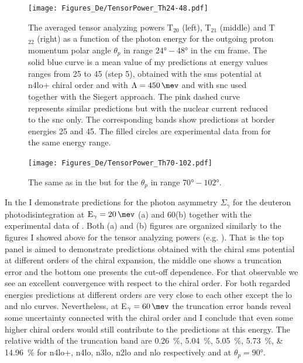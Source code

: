    \begin{figure}[h]
        \begin{center}
        \texttt{[image: Figures\_De/TensorPower\_Th24-48.pdf]}
        \end{center}
        \caption{The averaged tensor analyzing powers T$_{20}$ (left),
        T$_{21}$ (middle) and T$_{22}$ (right) as a function of the
        photon energy for the outgoing proton momentum polar angle $\theta_p$
        in range $\ang{24} - \ang{48}$ in the \gls{cm} frame.
        The solid blue curve is a mean value of my predictions at energy values ranges
        from 25 to \SI{45}{\mev} (step \SI{5}{\mev}), obtained with
        the \gls{sms} potential at \gls{n4lo+} chiral order and with $\Lambda=\SI{450}{\mev}$
        and with \gls{snc} used together with the Siegert approach. 
        The pink dashed curve represents similar predictions but with
        the nuclear current reduced to the \gls{snc} only. 
        The corresponding bands show predictions at border energies 25 and \SI{45}{\mev}.
        The filled circles are experimental data
        from \cite{rachek2007} for the same energy range.}
        \label{tensor_energy_24-48}
    \end{figure}

    \begin{figure}[h]
        \begin{center}
        \texttt{[image: Figures\_De/TensorPower\_Th70-102.pdf]}
        \end{center}
        \caption{The same as in the  but
        for the $\theta_p$ in range $\ang{70} - \ang{102}$.}
        \label{tensor_energy_70-102}
    \end{figure}
    
    In the  I demonstrate predictions
    for the photon asymmetry $\Sigma_\gamma$ for the 
    deuteron photodisintegration at $\text{E}_\gamma=\SI{20}{\mev}$ (a)
    and \SI{60}{\mev}(b) together with the experimental data of 
    \cite{KRAUSE1992_asymetry, depascale_asymmetry, Barannik_asymetry, Vnukov_asymmetry}.
    Both (a) and (b) figures are organized similarly to the 
    figures I showed above for the tensor analyzing powers (e.g. ).
    That is the top panel is aimed to demonstrate predictions obtained
    with the chiral \gls{sms} potential at different orders of the chiral expansion,
    the middle one shows a truncation error and the bottom one presents 
    the cut-off dependence. For that observable we see an excellent 
    convergence with respect to the chiral order. For both regarded 
    energies predictions at different orders are very close to each other
    except the \gls{lo} and \gls{nlo} curves. Nevertheless, at E$_\gamma = \SI{60}{\mev}$
    the truncation error bands reveal some uncertainty connected 
    with the chiral order and I conclude that even some higher chiral 
    orders would still contribute to the predictions at this energy.
    The relative width of the truncation band are 
    \SIlist{0.26;5.04;5.05;5.73;14.96}{\percent} for \gls{n4lo+}, \gls{n4lo}, \gls{n3lo},
    \gls{n2lo} and \gls{nlo} respectively and at $\theta_p=\ang{90}$.

